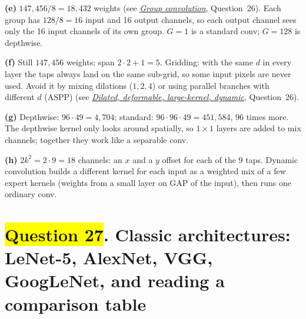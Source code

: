 \documentclass[12pt,a4paper]{article}
\newcommand{\seeconcept}[3]{(see \hyperref[#1]{\textit{#2}}, Question~#3)}
\newcommand{\hlq}[1]{{\setlength{\fboxsep}{1.5pt}\colorbox{yellow}{#1}}}
\begin{document}
\textbf{(e)} $147{,}456/8=18{,}432$ weights \seeconcept{c:groupconv}{Group convolution}{26}. Each group has $128/8=16$ input and 16 output channels, so each output channel sees only the 16 input channels of its own group. $G=1$ is a standard conv; $G=128$ is depthwise.

\textbf{(f)} Still $147{,}456$ weights; span $2\cdot2+1=5$. Gridding: with the same $d$ in every layer the taps always land on the same sub-grid, so some input pixels are never used. Avoid it by mixing dilations ($1,2,4$) or using parallel branches with different $d$ (ASPP) \seeconcept{c:convvariants}{Dilated, deformable, large-kernel, dynamic}{26}.

\textbf{(g)} Depthwise: $96\cdot49=4{,}704$; standard: $96\cdot96\cdot49=451{,}584$, 96 times more. The depthwise kernel only looks around spatially, so $1\times1$ layers are added to mix channels; together they work like a separable conv.

\textbf{(h)} $2k^2=2\cdot9=18$ channels: an $x$ and a $y$ offset for each of the 9 taps. Dynamic convolution builds a different kernel for each input as a weighted mix of a few expert kernels (weights from a small layer on GAP of the input), then runs one ordinary conv.
\section[Question 27. Classic architectures: LeNet-5, AlexNet, VGG, GoogLeNet, and reading a comparison table]{\hlq{Question 27}. Classic architectures: LeNet-5, AlexNet, VGG, GoogLeNet, and reading a comparison table}
\end{document}
